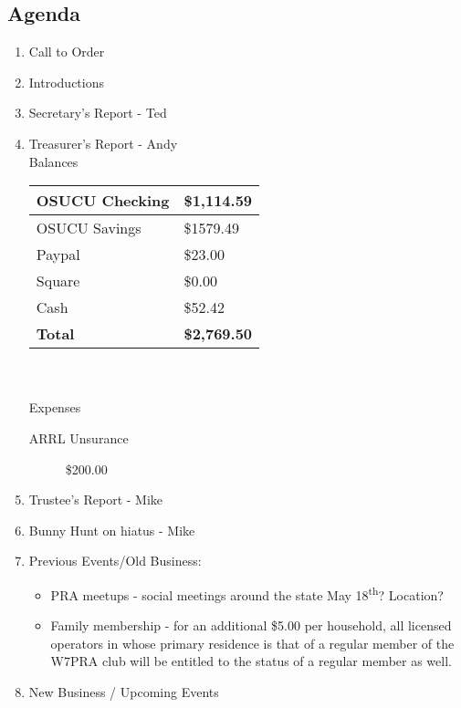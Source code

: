 \documentclass[letter,11pt]{extarticle}
\begin{document}
	\subsection*{Agenda}
	\begin{enumerate}
		\item Call to Order
		\item Introductions
		\item Secretary's Report - Ted
		\item Treasurer's Report - Andy \\
				Balances 
			\begin{tabular}{|l|l|} \hline
				OSUCU Checking & \$1,114.59 \\ \hline
				OSUCU Savings & \$1579.49 \\ \hline
				Paypal & \$23.00 \\ \hline
				Square & \$0.00 \\ \hline
				Cash & \$52.42 \\ \hline
				\textbf{Total} & \textbf{\$2,769.50} \\ \hline
			\end{tabular} \\ \\
			Expenses
			\begin{description}
				\item[ARRL Unsurance] \$200.00
			\end{description}
		\item Trustee's Report - Mike
		\item Bunny Hunt on hiatus - Mike
		\item Previous Events/Old Business:
			\begin{itemize}
				\item PRA meetups - social meetings around the state May 18\textsuperscript{th}? Location?
				\item Family membership - for an additional \$5.00 per household, all licensed operators in whose primary residence is that of a regular member of the W7PRA club will be entitled to the status of a regular member as well.
			\end{itemize}
		\item  New Business / Upcoming Events
			\begin{itemize}

\end{itemize}
\end{enumerate}
\end{document}

